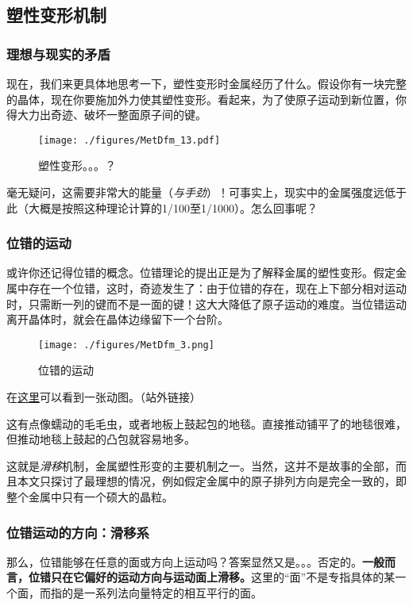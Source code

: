 \subsection{塑性变形机制}

\subsubsection{理想与现实的矛盾}
现在，我们来更具体地思考一下，塑性变形时金属经历了什么。假设你有一块完整的晶体，现在你要施加外力使其塑性变形。看起来，为了使原子运动到新位置，你得大力出奇迹、破坏一整面原子间的键。
\begin{figure}[ht]
\centering
\texttt{[image: ./figures/MetDfm\_13.pdf]}
\caption{塑性变形。。。？} \label{MetDfm_fig13}
\end{figure}
毫无疑问，这需要非常大的能量（\textsl{与手劲}）！可事实上，现实中的金属强度远低于此（大概是按照这种理论计算的1/100至1/1000）。怎么回事呢？

\subsubsection{位错的运动}
或许你还记得位错的概念。位错理论的提出正是为了解释金属的塑性变形。假定金属中存在一个位错，这时，奇迹发生了：由于位错的存在，现在上下部分相对运动时，只需断一列的键而不是一面的键！这大大降低了原子运动的难度。当位错运动离开晶体时，就会在晶体边缘留下一个台阶。
\begin{figure}[ht]
\centering
\texttt{[image: ./figures/MetDfm\_3.png]}
\caption{位错的运动} \label{MetDfm_fig3}
\end{figure}

在\href{https://m.sohu.com/a/350972084_120056486/}{这里}可以看到一张动图。（站外链接）

这有点像蠕动的毛毛虫，或者地板上鼓起包的地毯。直接推动铺平了的地毯很难，但推动地毯上鼓起的凸包就容易地多。

这就是\textsl{滑移}机制，金属塑性形变的主要机制之一。当然，这并不是故事的全部，而且本文只探讨了最理想的情况，例如假定金属中的原子排列方向是完全一致的，即整个金属中只有一个硕大的晶粒。

\subsubsection{位错运动的方向：滑移系}
那么，位错能够在任意的面或方向上运动吗？答案显然又是。。。否定的。\textbf{一般而言，位错只在它偏好的运动方向与运动面上滑移。}这里的“面”不是专指具体的某一个面，而指的是一系列法向量特定的相互平行的面。

